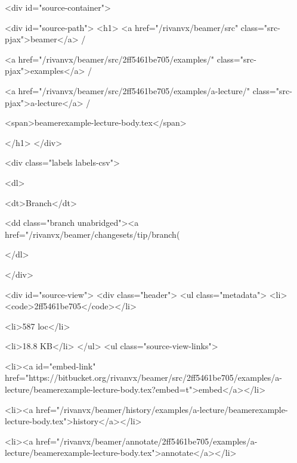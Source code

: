       
  <div id="source-container">
    

  <div id="source-path">
    <h1>
      <a href="/rivanvx/beamer/src" class="src-pjax">beamer</a> /

  
    
      <a href="/rivanvx/beamer/src/2ff5461be705/examples/" class="src-pjax">examples</a> /
    
  

  
    
      <a href="/rivanvx/beamer/src/2ff5461be705/examples/a-lecture/" class="src-pjax">a-lecture</a> /
    
  

  
    
      <span>beamerexample-lecture-body.tex</span>
    
  

    </h1>
  </div>

  <div class="labels labels-csv">
  
    <dl>
  
    
  
  
    
  
  
    <dt>Branch</dt>
    
      
        <dd class="branch unabridged"><a href="/rivanvx/beamer/changesets/tip/branch(%
      
    
  
</dl>

  
  </div>


  
  <div id="source-view">
    <div class="header">
      <ul class="metadata">
        <li><code>2ff5461be705</code></li>
        
          
            <li>587 loc</li>
          
        
        <li>18.8 KB</li>
      </ul>
      <ul class="source-view-links">
        
        <li><a id="embed-link" href="https://bitbucket.org/rivanvx/beamer/src/2ff5461be705/examples/a-lecture/beamerexample-lecture-body.tex?embed=t">embed</a></li>
        
        <li><a href="/rivanvx/beamer/history/examples/a-lecture/beamerexample-lecture-body.tex">history</a></li>
        
        <li><a href="/rivanvx/beamer/annotate/2ff5461be705/examples/a-lecture/beamerexample-lecture-body.tex">annotate</a></li>
        
